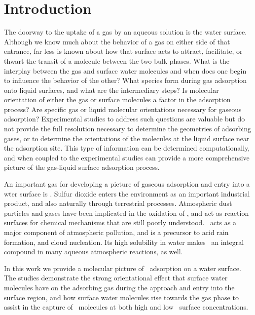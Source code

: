 \section{Introduction}

The doorway to the uptake of a gas by an aqueous solution is the water surface. Although we know much about the behavior of a gas on either side of that entrance, far less is known about how that surface acts to attract, facilitate, or thwart the transit of a molecule between the two bulk phases. What is the interplay between the gas and surface water molecules and when does one begin to influence the behavior of the other? What species form during gas adsorption onto liquid surfaces, and what are the intermediary steps?  Is molecular orientation of either the gas or surface molecules a factor in the adsorption process? Are specific gas or liquid molecular orientations necessary for gaseous adsorption?  Experimental studies to address such questions are valuable but do not provide the full resolution necessary to determine the geometries of adsorbing gases, or to determine the orientations of the molecules at the liquid surface near the adsorption site. This type of information can be determined computationally, and when coupled to the experimental studies can provide a more comprehensive picture of the gas-liquid surface adsorption process.

An important gas for developing a picture of gaseous adsorption and entry into a wter surface is \suldiox.\cite{Lattanzi2010,Shah2011,Tzivian2011,Johns2011,Faloona2009,Jurkat2010,Wu2011} Sulfur dioxide enters the environment as an important industrial product, and also naturally through terrestrial processes. Atmospheric dust particles and gases have been implicated in the oxidation of \suldiox, and act as reaction surfaces for chemical mechanisms that are still poorly understood.\cite{Baltrusaitis2011,Rubasinghege2010,Li2007} \suldiox~acts as a major component of atmospheric pollution, and is a precursor to acid rain formation, and cloud nucleation. Its high solubility in water makes \suldiox~an integral compound in many aqueous atmospheric reactions, as well. 

In this work we provide a molecular picture of \suldiox~adsorption on a water surface.  The studies demonstrate the strong orientational effect that surface water molecules have on the adsorbing gas during the approach and entry into the surface region, and how surface water molecules rise towards the gas phase to assist in the capture of \suldiox~molecules at both high and low \suldiox~surface concentrations. 

